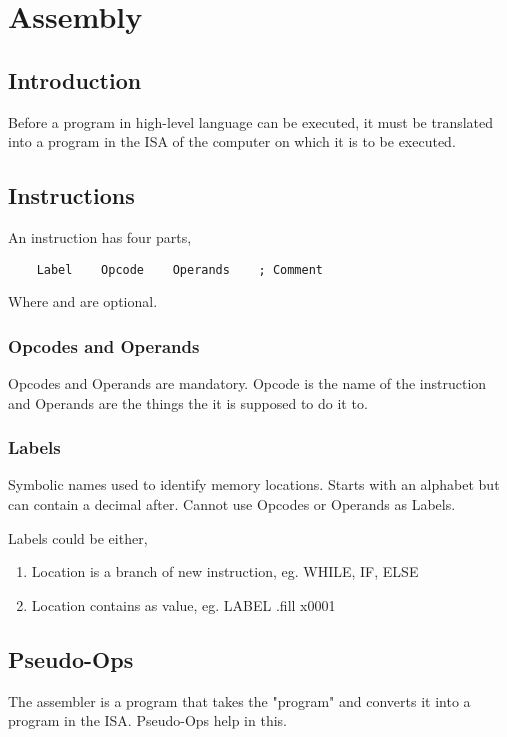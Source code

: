 \setcounter{chapter}{6}
\chapter{Assembly}
\section{Introduction}
Before a program in high-level language can be executed, it must be translated into a program in the ISA of the computer on which it is to be executed.


\section{Instructions}
An instruction has four parts, 
\begin{verbatim}
    Label    Opcode    Operands    ; Comment
\end{verbatim}

Where  and  are optional.

\subsection{Opcodes and Operands}
Opcodes and Operands are mandatory. Opcode is the name of the instruction and Operands are the things the it is supposed to do it to.

\subsection{Labels}
Symbolic names used to identify memory locations. Starts with an alphabet but can contain a decimal after. Cannot use Opcodes or Operands as Labels.

Labels could be either, 
\begin{enumerate}
    \item Location is a branch of new instruction, eg. WHILE, IF, ELSE
    \item Location contains as value, eg. LABEL .fill x0001
\end{enumerate}



\section{Pseudo-Ops}
The assembler is a program that takes the "program" and converts it into a program in the ISA. Pseudo-Ops help in this.

